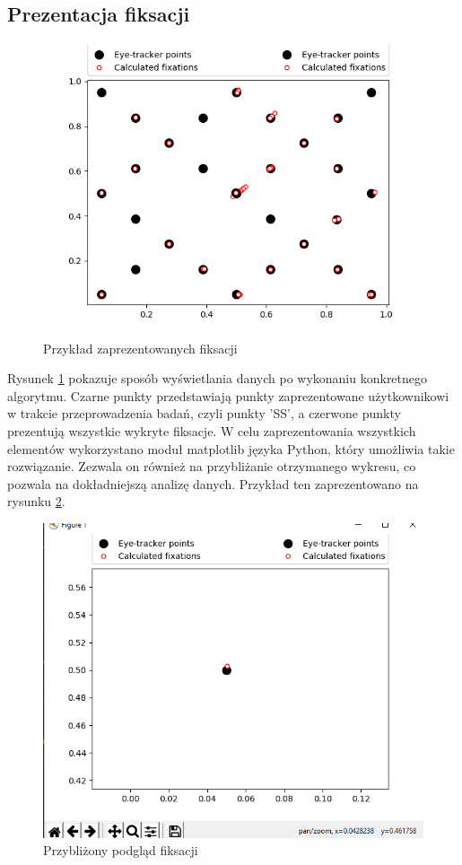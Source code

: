 \subsection{Prezentacja fiksacji}
\label{ssec:fixations}
\begin{figure}[H]
        \centering
        \captionsetup{justification=centering,margin=2cm}
        \includegraphics[width=0.8\linewidth]{resources/calculated_fixations.png}
        \caption{Przykład zaprezentowanych fiksacji}
        \label{fig:presentationfixation}
\end{figure}
Rysunek \ref{fig:presentationfixation} pokazuje sposób wyświetlania danych po wykonaniu konkretnego algorytmu. Czarne punkty przedstawiają punkty zaprezentowane użytkownikowi w trakcie przeprowadzenia badań, czyli punkty 'SS', a czerwone punkty prezentują wszystkie wykryte fiksacje. W celu zaprezentowania wszystkich elementów wykorzystano moduł matplotlib języka Python, który umożliwia takie rozwiązanie. Zezwala on również na przybliżanie otrzymanego wykresu, co pozwala na dokładniejszą analizę danych. Przykład ten zaprezentowano na rysunku \ref{fig:zoomedfixation}.
\begin{figure}[H]
        \centering
        \captionsetup{justification=centering,margin=2cm}
        \includegraphics[width=0.8\linewidth]{resources/zoomed_fixation.png}
        \caption{Przybliżony podgląd fiksacji}
        \label{fig:zoomedfixation}
\end{figure}
